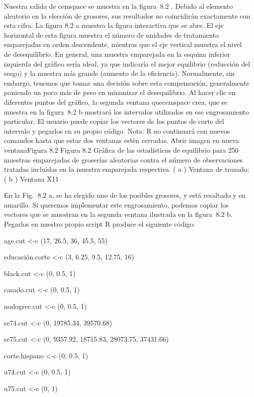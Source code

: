 \documentclass[
]{book}
\begin{document}
Nuestra salida de cemspace se muestra en la figura  8.2 . Debido al elemento aleatorio en la elección de grosores, sus resultados no coincidirán exactamente con esta cifra. La figura 8.2 a muestra la figura interactiva que se abre. El eje horizontal de esta figura muestra el número de unidades de tratamiento emparejadas en orden descendente, mientras que el eje vertical muestra el nivel de desequilibrio. En general, una muestra emparejada en la esquina inferior izquierda del gráfico sería ideal, ya que indicaría el mejor equilibrio (reducción del sesgo) y la muestra más grande (aumento de la eficiencia). Normalmente, sin embargo, tenemos que tomar una decisión sobre esta compensación, generalmente poniendo un poco más de peso en minimizar el desequilibrio. Al hacer clic en diferentes puntos del gráfico, la segunda ventana quecemspace crea, que se muestra en la figura  8.2 b mostrará los intervalos utilizados en ese engrosamiento particular. El usuario puede copiar los vectores de los puntos de corte del intervalo y pegarlos en su propio código. Nota: R no continuará con nuevos comandos hasta que estas dos ventanas estén cerradas.
Abrir imagen en nueva ventanaFigura 8.2
Figura 8.2
Gráfica de las estadísticas de equilibrio para 250 muestras emparejadas de groserías aleatorias contra el número de observaciones tratadas incluidas en la muestra emparejada respectiva. ( a ) Ventana de trazado; ( b ) Ventana X11

En la Fig.  8.2 a, se ha elegido uno de los posibles grosores, y está resaltado y en amarillo. Si queremos implementar este engrosamiento, podemos copiar los vectores que se muestran en la segunda ventana ilustrada en la figura  8.2 b. Pegarlos en nuestro propio script R produce el siguiente código:

age.cut \textless-c (17, 26.5, 36, 45.5, 55)

educación.corte \textless-c (3, 6.25, 9.5, 12.75, 16)

black.cut \textless-c (0, 0.5, 1)

casado.cut \textless-c (0, 0.5, 1)

nodogree.cut \textless-c (0, 0.5, 1)

re74.cut \textless-c (0, 19785.34, 39570.68)

re75.cut \textless-c (0, 9357.92, 18715.83, 28073.75, 37431.66)

corte.hispano \textless-c (0, 0.5, 1)

u74.cut \textless-c (0, 0.5, 1)

u75.cut \textless-c (0, 1)
\end{document}
